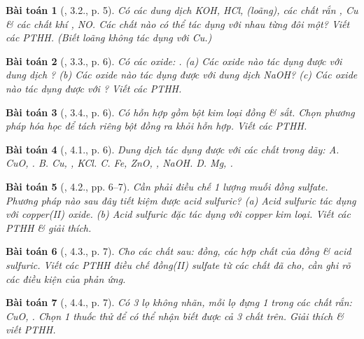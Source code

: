 \documentclass{article}
\newtheorem{baitoan}{Bài toán}
\begin{document}
\begin{baitoan}[\cite{SBT_Hoa_Hoc_9}, 3.2., p. 5]
	Có các dung dịch \emph{KOH, HCl, } (loãng), các chất rắn \emph{, Cu} \& các chất khí \emph{, NO}. Các chất nào có thể tác dụng với nhau từng đôi một? Viết các PTHH. (Biết \emph{} loãng không tác dụng với \emph{Cu}.)
\end{baitoan}

\begin{baitoan}[\cite{SBT_Hoa_Hoc_9}, 3.3., p. 6]
	Có các oxide: \emph{}. (a) Các oxide nào tác dụng được với dung dịch \emph{}? (b) Các oxide nào tác dụng được với dung dịch \emph{NaOH}? (c) Các oxide nào tác dụng được với \emph{}? Viết các PTHH.
\end{baitoan}

\begin{baitoan}[\cite{SBT_Hoa_Hoc_9}, 3.4., p. 6]
	Có hỗn hợp gồm bột kim loại đồng \& sắt. Chọn phương pháp hóa học để tách riêng bột đồng ra khỏi hỗn hợp. Viết các PTHH.
\end{baitoan}

\begin{baitoan}[\cite{SBT_Hoa_Hoc_9}, 4.1., p. 6]
	Dung dịch \emph{} tác dụng được với các chất trong dãy: {\sf A.} \emph{CuO, }. {\sf B.} \emph{Cu, , KCl}. {\sf C.} \emph{Fe, ZnO, , NaOH}. {\sf D.} \emph{Mg, }.
\end{baitoan}

\begin{baitoan}[\cite{SBT_Hoa_Hoc_9}, 4.2., pp. 6--7]
	Cần phải điều chế 1 lượng muối đồng sulfate. Phương pháp nào sau đây tiết kiệm được acid sulfuric? (a) Acid sulfuric tác dụng với copper(II) oxide. (b) Acid sulfuric đặc tác dụng với copper kim loại. Viết các PTHH \& giải thích.
\end{baitoan}

\begin{baitoan}[\cite{SBT_Hoa_Hoc_9}, 4.3., p. 7]
	Cho các chất sau: đồng, các hợp chất của đồng \& acid sulfuric. Viết các PTHH điều chế đồng(II) sulfate từ các chất đã cho, cần ghi rõ các điều kiện của phản ứng.
\end{baitoan}

\begin{baitoan}[\cite{SBT_Hoa_Hoc_9}, 4.4., p. 7]
	Có 3 lọ không nhãn, mỗi lọ đựng 1 trong các chất rắn: \emph{CuO, }. Chọn 1 thuốc thử để có thể nhận biết được cả 3 chất trên. Giải thích \& viết PTHH.
\end{baitoan}
\end{document}
